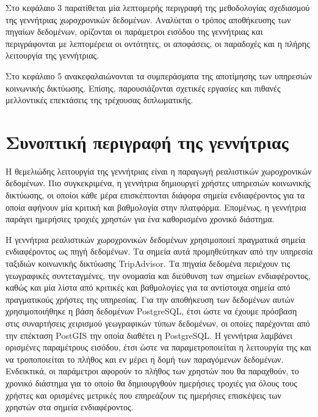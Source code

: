 Στο κεφάλαιο 3 παρατίθεται μία λεπτομερής περιγραφή της μεθοδολογίας σχεδιασμού της γεννήτριας χωροχρονικών δεδομένων. Αναλύεται ο τρόπος αποθήκευσης των πηγαίων 
δεδομένων, ορίζονται οι παράμετροι εισόδου της γεννήτριας και περιγράφονται με λεπτομέρεια οι οντότητες, οι αποφάσεις, οι παραδοχές και η πλήρης λειτουργία της 
γεννήτριας. 

Στο κεφάλαιο 5 ανακεφαλαιώνονται τα συμπεράσματα της αποτίμησης των υπηρεσιών \linebreak κοινωνικής δικτύωσης. Επίσης, παρουσιάζονται σχετικές εργασίες και πιθανές 
μελλοντικές επεκτάσεις της τρέχουσας διπλωματικής. 


\section{Συνοπτική περιγραφή της γεννήτριας}

Η θεμελιώδης λειτουργία της γεννήτριας είναι η παραγωγή ρεαλιστικών χωροχρονικών \linebreak δεδομένων. 
Πιο συγκεκριμένα, η γεννήτρια δημιουργεί χρήστες υπηρεσιών κοινωνικής δικτύωσης, οι οποίοι κάθε μέρα επισκέπτονται διάφορα 
σημεία ενδιαφέροντος για τα οποία αφήνουν μία κριτική και βαθμολογία στην πλατφόρμα. Επομένως, η γεννήτρια παράγει ημερήσιες τροχιές χρηστών για ένα 
καθορισμένο χρονικό διάστημα. 

Η γεννήτρια ρεαλιστικών χωροχρονικών δεδομένων χρησιμοποιεί πραγματικά σημεία \linebreak ενδιαφέροντος ως πηγή δεδομένων. Τα σημεία αυτά προμηθεύτηκαν από την υπηρεσία 
ταξιδιών κοινωνικής δικτύωσης TripAdvisor. Τα πηγαία δεδομένα περιέχουν τις γεωγραφικές \linebreak συντεταγμένες, την ονομασία και διεύθυνση των σημείων ενδιαφέροντος, 
καθώς και μία λίστα από κριτικές και βαθμολογίες για τα αντίστοιχα σημεία από πραγματικούς χρήστες της υπηρεσίας. Για την αποθήκευση των δεδομένων αυτών 
χρησιμοποιήθηκε η βάση δεδομένων PostgreSQL, έτσι ώστε να έχουμε πρόσβαση στις συναρτήσεις χειρισμού γεωγραφικών τύπων δεδομένων, οι οποίες παρέχονται 
από την επέκταση PostGIS την οποία διαθέτει η PostgreSQL. Η γεννήτρια λαμβάνει ορισμένες παραμέτρους εισόδου, έτσι ώστε να παραμετροποιείται η λειτουργία της 
και να τροποποιείται το πλήθος και εν μέρει η δομή των παραγόμενων δεδομένων. Ενδεικτικά, οι παράμετροι αφορούν το πλήθος των χρηστών που θα παραχθούν, το 
χρονικό διάστημα για το οποίο θα δημιουργθούν ημερήσιες τροχιές για όλους τους χρήστες και ορισμένες μετρικές που επηρεάζουν τις ημερήσιες επισκέψεις των χρηστών 
στα σημεία ενδιαφέροντος.

